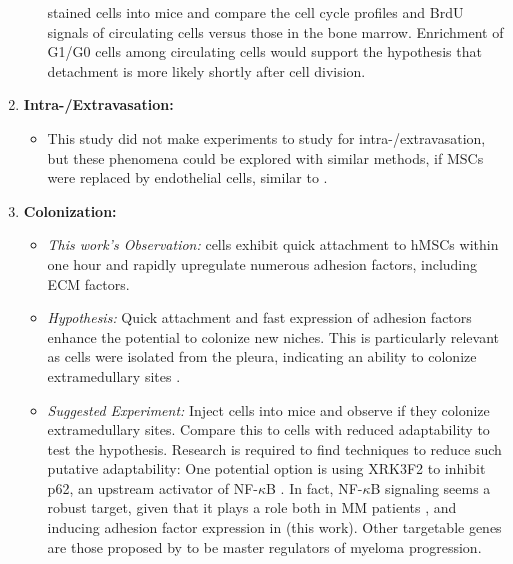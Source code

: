 \begin{enumerate}
\begin{itemize}
                        stained \INA cells into mice and compare the cell cycle
                        profiles and BrdU signals of circulating cells versus
                        those in the bone marrow. Enrichment of G1/G0 cells
                        among circulating cells would support the hypothesis
                        that detachment is more likely shortly after cell
                        division.
            \end{itemize}
      \item \textbf{Intra-/Extravasation:}
            \begin{itemize}
                  \item This study did not make experiments to study for
                        intra-/extravasation, but these phenomena could be
                        explored with similar methods, if MSCs were replaced by
                        endothelial cells, similar to
                        \citet{solimandoJAMAPrognosticFactor2018}.
            \end{itemize}
      \item \textbf{Colonization:}
            \begin{itemize}
                  \item \textit{This work's Observation:} \INA cells exhibit quick
                        attachment to \acp{hMSC} within one hour and rapidly
                        upregulate numerous adhesion factors, including \ac{ECM}
                        factors.
                  \item \textit{Hypothesis:} Quick attachment and fast
                        expression of adhesion factors enhance the potential to
                        colonize new niches. This is particularly relevant as \INA
                        cells were isolated from the pleura, indicating an ability to
                        colonize extramedullary sites
                        \cite{burgerGp130RasMediated2001}.
                  \item \textit{Suggested Experiment:} Inject \INA cells into mice and
                        observe if they colonize extramedullary sites. Compare
                        this to \INA cells with reduced adaptability to test the
                        hypothesis. Research is required to find techniques to
                        reduce such putative adaptability: One potential option
                        is using XRK3F2 to inhibit p62, an upstream activator of
                        NF-$\kappa$B \cite{adamikXRK3F2InhibitionP62ZZ2018}. In
                        fact, NF-$\kappa$B signaling seems a robust target,
                        given that it plays a role both in MM patients
                        \cite{sarinEvaluatingEfficacyMultiple2020}, and inducing
                        adhesion factor expression in \INA (this work). Other
                        targetable genes are those proposed by
                        \citet{shenProgressionSignatureUnderlies2021} to be
                        master regulators of myeloma progression.
            \end{itemize}
\end{enumerate}


